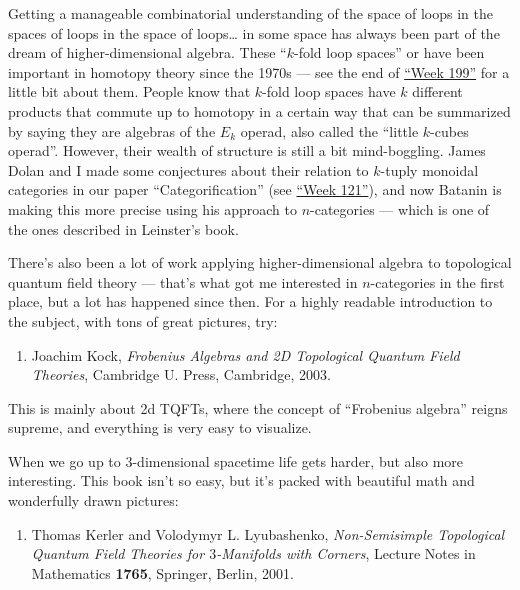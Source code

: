 \documentclass{article}
\def\tightlist{}
\begin{document}
Getting a manageable combinatorial understanding of the space of loops
in the spaces of loops in the space of loops\ldots{} in some space has
always been part of the dream of higher-dimensional algebra. These
``\(k\)-fold loop spaces'' or have been important in homotopy theory
since the 1970s --- see the end of \protect\hyperlink{week199}{``Week
199''} for a little bit about them. People know that \(k\)-fold loop
spaces have \(k\) different products that commute up to homotopy in a
certain way that can be summarized by saying they are algebras of the
\(E_k\) operad, also called the ``little \(k\)-cubes operad''. However,
their wealth of structure is still a bit mind-boggling. James Dolan and
I made some conjectures about their relation to \(k\)-tuply monoidal
categories in our paper ``Categorification'' (see
\protect\hyperlink{week121}{``Week 121''}), and now Batanin is making
this more precise using his approach to \(n\)-categories --- which is
one of the ones described in Leinster's book.

There's also been a lot of work applying higher-dimensional algebra to
topological quantum field theory --- that's what got me interested in
\(n\)-categories in the first place, but a lot has happened since then.
For a highly readable introduction to the subject, with tons of great
pictures, try:

\begin{enumerate}
\def\labelenumi{\arabic{enumi})}
\setcounter{enumi}{11}
\tightlist
\item
  Joachim Kock, \emph{Frobenius Algebras and 2D Topological Quantum
  Field Theories}, Cambridge U. Press, Cambridge, 2003.
\end{enumerate}

This is mainly about 2d TQFTs, where the concept of ``Frobenius
algebra'' reigns supreme, and everything is very easy to visualize.

When we go up to \(3\)-dimensional spacetime life gets harder, but also
more interesting. This book isn't so easy, but it's packed with
beautiful math and wonderfully drawn pictures:

\begin{enumerate}
\def\labelenumi{\arabic{enumi})}
\setcounter{enumi}{12}
\tightlist
\item
  Thomas Kerler and Volodymyr L. Lyubashenko, \emph{Non-Semisimple
  Topological Quantum Field Theories for \(3\)-Manifolds with Corners},
  Lecture Notes in Mathematics \textbf{1765}, Springer, Berlin, 2001.
\end{enumerate}
\end{document}

